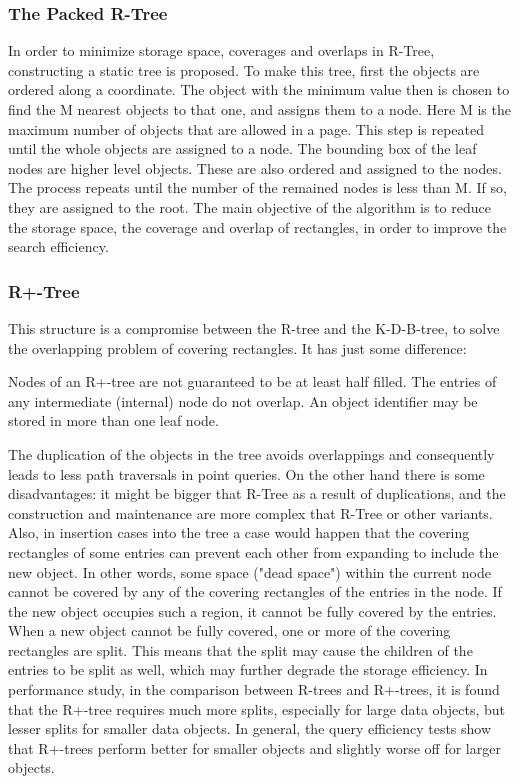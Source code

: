 \documentclass[a4paper,12pt]{article}
\begin{document}
\subsubsection{The Packed R-Tree}

In order to minimize storage space, coverages and overlaps in R-Tree, constructing a static tree is proposed. To make this tree, first the objects are ordered along a coordinate. The object with the minimum value then is chosen to find the M nearest objects to that one, and assigns them to a node. Here M is the maximum number of objects that are allowed in a page. This step is repeated until the whole objects are assigned to a node. The bounding box of the leaf nodes are higher level objects. These are also ordered and assigned to the nodes. The process repeats until the number of the remained nodes is less than M. If so, they are assigned to the root.
The main objective of the algorithm is to reduce the storage space, the coverage and overlap of rectangles, in order to improve the search efficiency.

\subsubsection{R+-Tree}

This structure is a compromise between the R-tree and the K-D-B-tree, to solve the overlapping problem of covering rectangles. It has just some difference:

Nodes of an R+-tree are not guaranteed to be at least half filled.
 The entries of any intermediate (internal) node do not overlap.
 An object identifier may be stored in more than one leaf node.

The duplication of the objects in the tree avoids overlappings and consequently leads to less path traversals in point queries. 
On the other hand there is some disadvantages: it might be bigger that R-Tree as a result of duplications, and the construction and maintenance are more complex that R-Tree or other variants. 
Also, in insertion cases into the tree a case would happen that the	covering rectangles of some entries can prevent each other from expanding to include the new object. In other words, some space ("dead space") within the current node cannot be covered by any of the covering rectangles of the entries in the node. If the new object occupies such a region, it cannot be fully covered by the entries. When a new object cannot be fully covered, one or more of the covering rectangles are split. This means that the split may cause the children of the entries to be split as well, which may further degrade the storage efficiency.
In performance study, in the comparison between R-trees and R+-trees, it is found that the R+-tree requires much more splits, especially for large data objects, but lesser splits for smaller data objects. 
In general, the query efficiency tests show that R+-trees perform better for smaller objects and slightly worse off for larger objects.
\end{document}

